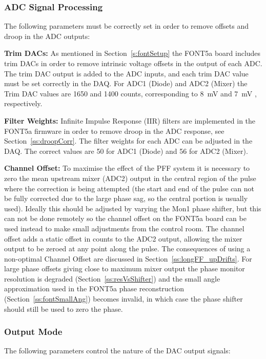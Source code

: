 \subsubsection{ADC Signal Processing}

The following parameters must be correctly set in order to remove offsets and droop in the ADC outputs:

\textbf{Trim DACs:} As mentioned in Section~\ref{s:fontSetup} the FONT5a board includes trim DACs in order to remove intrinsic voltage offsets in the output of each ADC. The trim DAC output is added to the ADC inputs, and each trim DAC value must be set correctly in the DAQ. For ADC1 (Diode) and ADC2 (Mixer) the Trim DAC values are 1650 and 1400 counts, corresponding to 8~mV and 7~mV \cite{dougThesis}, respectively.

\textbf{Filter Weights:} Infinite Impulse Response (IIR) filters are implemented in the FONT5a firmware in order to remove droop in the ADC response, see Section~\ref{ss:droopCorr}. The filter weights for each ADC can be adjusted in the DAQ. The correct values are 50 for ADC1 (Diode) and 56 for ADC2 (Mixer).

\textbf{Channel Offset:} To maximise the effect of the PFF system it is necessary to zero the mean upstream mixer (ADC2) output in the central region of the pulse where the correction is being attempted (the start and end of the pulse can not be fully corrected due to the large phase sag, so the central portion is usually used). Ideally this should be adjusted by varying the Mon1 phase shifter, but this can not be done remotely so the channel offset on the FONT5a board can be used instead to make small adjustments from the control room. The channel offset adds a static offset in counts to the ADC2 output, allowing the mixer output to be zeroed at any point along the pulse. The consequences of using a non-optimal Channel Offset are discussed in Section~\ref{ss:longFF_upDrifts}. For large phase offsets giving close to maximum mixer output the phase monitor resolution is degraded (Section~\ref{ss:resVsShifter}) and the small angle approximation used in the FONT5a phase reconstruction (Section~\ref{ss:fontSmallAng}) becomes invalid, in which case the phase shifter should still be used to zero the phase. 

\subsubsection{Output Mode}

The following parameters control the nature of the DAC output signals:

